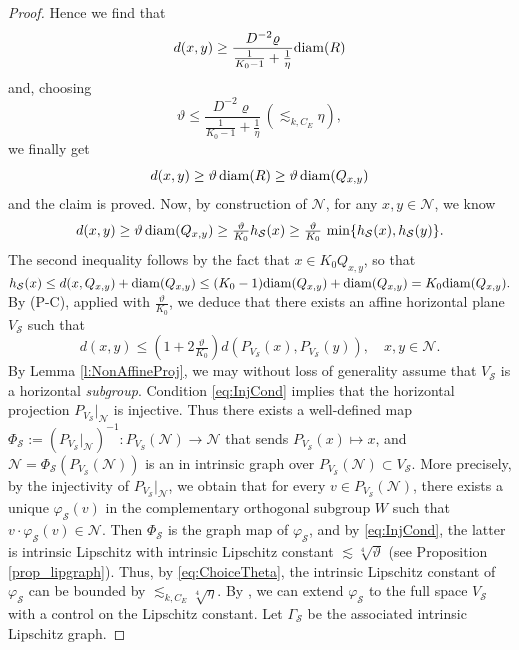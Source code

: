 \documentclass[12pt]{amsart}
\newcommand{\diam}{{\rm diam}}
\renewcommand{\rho}{\varrho}
\renewcommand{\theta}{\vartheta}
\numberwithin{equation}{section}
\theoremstyle{plain}
\theoremstyle{definition}
\theoremstyle{remark}
\begin{document}
\begin{proof}
Hence we find that 
\[d(x,y)\geq \frac{D^{-2}\rho}{\frac{1}{K_0-1}+\frac{1}{\eta}}\diam(R)\]
and, choosing 
\begin{equation}\label{eq:ChoiceTheta}\theta\leq \frac{D^{-2}\rho}{\frac{1}{K_0-1}+\frac{1}{\eta}} \,(\lesssim_{k,C_E} \eta),
\end{equation}
we finally get
\[d(x,y)\geq \theta\,\diam(R)\geq \theta \,\diam(Q_{x,y})\] and the claim is proved.
Now, by construction of $\mathcal N$, for any $x,y\in \mathcal N$, we know \[d(x,y)\geq \theta\, \diam(Q_{x,y})\geq \tfrac{\theta}{K_0} h_\mathcal S(x)\geq \tfrac{\theta}{K_0}\,\min\{h_\mathcal S(x),h_\mathcal S(y)\}.\]
The second inequality follows by the fact that $x\in K_0 Q_{x,y}$, so that $h_\mathcal S(x)\leq d(x,Q_{x,y})+\diam(Q_{x,y})\leq (K_0-1)\diam(Q_{x,y})+\diam(Q_{x,y})=K_0\diam(Q_{x,y}).$
By (P-C), applied with $\frac{\theta}{K_0}$, we deduce that there exists an affine horizontal plane $V_{\mathcal{S}}$ such that
\begin{equation}\label{eq:InjCond}d(x,y)\leq (1+2\tfrac{\theta}{K_0})d(P_{V_\mathcal S}(x),P_{V_{\mathcal S}}(y)),\quad x,y\in \mathcal{N}.\end{equation}
By Lemma \ref{l:NonAffineProj}, we may without loss of generality assume that $V_{\mathcal{S}}$ is a horizontal \emph{subgroup}. Condition \eqref{eq:InjCond} implies that the 
horizontal projection ${P_{V_{\mathcal{S}}}}|_{\mathcal{N}}$ is injective. Thus there exists a well-defined map
 $\Phi_{\mathcal{S}}:=({P_{V_{\mathcal{S}}}}|_{\mathcal{N}})^{-1}:P_{V_S}(\mathcal N)\to\mathcal N$ that sends $P_{V_\mathcal S}(x)\mapsto x$, and $\mathcal{N}= \Phi_{\mathcal{S}}(P_{V_{\mathcal{S}}}(\mathcal{N}))$ is an in intrinsic graph over $P_{V_{\mathcal{S}}}(\mathcal{N})\subset V_{\mathcal{S}}$. More precisely, by the injectivity of ${P_{V_{\mathcal{S}}}}|_{\mathcal{N}}$, we obtain that for every $v\in P_{V_{\mathcal{S}}}(\mathcal{N})$, there exists a unique $\varphi_{\mathcal{S}}(v)$ in the complementary orthogonal subgroup $W$ such that $v\cdot \varphi_{\mathcal{S}}(v) \in \mathcal{N}$. Then $\Phi_{\mathcal{S}}$ is the graph map of $\varphi_{\mathcal{S}}$, and by \eqref{eq:InjCond}, the latter 
 is intrinsic Lipschitz with intrinsic Lipschitz constant $\lesssim \sqrt[4]{\theta}$  (see Proposition \ref{prop_lipgraph}). Thus, by \eqref{eq:ChoiceTheta}, the intrinsic Lipschitz constant of $\varphi_{\mathcal{S}}$ can be bounded by $\lesssim_{k,C_E} \sqrt[4]{\eta}$.
 By \cite{didonato}, we can extend $\varphi_{\mathcal{S}}$ to the full space $V_{\mathcal S}$ with a control on the Lipschitz constant. Let $\Gamma_\mathcal S$ be the associated intrinsic Lipschitz graph. 



\end{proof}
\end{document}
